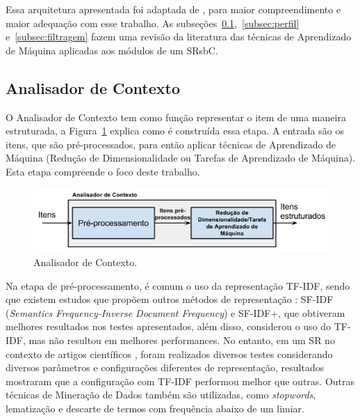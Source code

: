 \documentclass[
    12pt,                %
    oneside,            %
    a4paper,            %
    english,            %
    brazil                %
    ]{abntex2ppgsi}
\begin{document}
Essa arquitetura apresentada foi adaptada de , para maior compreendimento e maior adequação com esse trabalho.
As subseções~\ref{subsec:analisadorcontexto},~\ref{subsec:perfil} e~\ref{subsec:filtragem} fazem uma revisão da literatura das técnicas de Aprendizado de Máquina aplicadas aos módulos de um SRsbC.

\subsection{Analisador de Contexto}
\label{subsec:analisadorcontexto}

O Analisador de Contexto tem como função representar o item de uma maneira estruturada, a Figura~\ref{fig:analisador} explica como é construída essa etapa. A entrada são os itens, que são pré-processados, para então aplicar técnicas de Aprendizado de Máquina (Redução de Dimensionalidade ou Tarefas de Aprendizado de Máquina).
Esta etapa compreende o foco deste trabalho.

\begin{figure}[h]
\centering
\includegraphics[scale=0.6]{img/analisador}
\caption{Analisador de Contexto.}
\label{fig:analisador}
\end{figure}

Na etapa de pré-processamento, é comum o uso da representação TF-IDF, sendo que existem estudos que propõem outros métodos de representação \cite{Capelle2012, Moerland2013}: SF-IDF (\textit{Semantics Frequency-Inverse Document Frequency}) e SF-IDF+, que obtiveram melhores resultados nos testes apresentados, além disso,  considerou o uso do TF-IDF, mas não resultou em melhores performances.
No entanto, em um SR no contexto de artigos científicos \cite{Beel2013}, foram realizados diversos testes considerando diversos parâmetros e configurações diferentes de representação, resultados mostraram que a configuração com TF-IDF performou melhor que outras.
Outras técnicas de Mineração de Dados também são utilizadas, como \textit{stopwords}, lematização e descarte de termos com frequência abaixo de um limiar.
\end{document}
